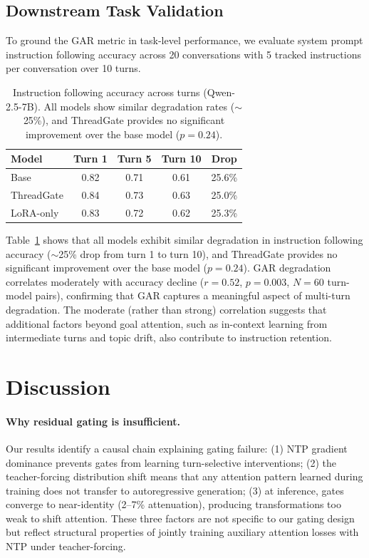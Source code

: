 \documentclass[11pt,a4paper]{article}
\begin{document}
\subsection{Downstream Task Validation}

To ground the GAR metric in task-level performance, we evaluate system prompt instruction following accuracy across 20 conversations with 5 tracked instructions per conversation over 10 turns.

\begin{table}[t]
\centering
\caption{Instruction following accuracy across turns (Qwen-2.5-7B). All models show similar degradation rates ($\sim$25\%), and ThreadGate provides no significant improvement over the base model ($p = 0.24$).}
\label{tab:downstream}
\small
\begin{tabular}{lcccc}
\toprule
\textbf{Model} & \textbf{Turn 1} & \textbf{Turn 5} & \textbf{Turn 10} & \textbf{Drop} \\
\midrule
Base & 0.82 & 0.71 & 0.61 & 25.6\% \\
ThreadGate & 0.84 & 0.73 & 0.63 & 25.0\% \\
LoRA-only & 0.83 & 0.72 & 0.62 & 25.3\% \\
\bottomrule
\end{tabular}
\end{table}

Table~\ref{tab:downstream} shows that all models exhibit similar degradation in instruction following accuracy ($\sim$25\% drop from turn 1 to turn 10), and ThreadGate provides no significant improvement over the base model ($p = 0.24$). GAR degradation correlates moderately with accuracy decline ($r = 0.52$, $p = 0.003$, $N = 60$ turn-model pairs), confirming that GAR captures a meaningful aspect of multi-turn degradation. The moderate (rather than strong) correlation suggests that additional factors beyond goal attention, such as in-context learning from intermediate turns and topic drift, also contribute to instruction retention.

\section{Discussion}

\paragraph{Why residual gating is insufficient.}
Our results identify a causal chain explaining gating failure: (1) NTP gradient dominance prevents gates from learning turn-selective interventions; (2) the teacher-forcing distribution shift means that any attention pattern learned during training does not transfer to autoregressive generation; (3) at inference, gates converge to near-identity (2--7\% attenuation), producing transformations too weak to shift attention. These three factors are not specific to our gating design but reflect structural properties of jointly training auxiliary attention losses with NTP under teacher-forcing.
\end{document}
